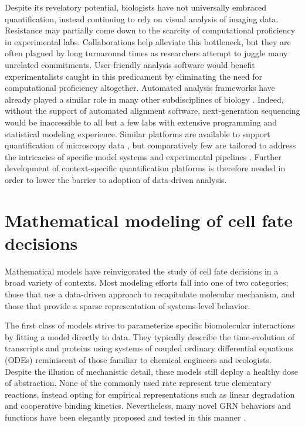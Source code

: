 Despite its revelatory potential, biologists have not universally embraced quantification, instead continuing to rely on visual analysis of imaging data. Resistance may partially come down to the scarcity of computational proficiency in experimental labs. Collaborations help alleviate this bottleneck, but they are often plagued by long turnaround times as researchers attempt to juggle many unrelated commitments. User-friendly analysis software would benefit experimentalists caught in this predicament by eliminating the need for computational proficiency altogether. Automated analysis frameworks have already played a similar role in many other subdisciplines of biology \cite{Aghaeepour2013,Chen2015,Pyne2009,Bernstein2008,Hellemans2007,Langmead2012,Trapnell2009,Costes2004,Kelley2015,Carpenter2006,Paintdakhi2016,Schindelin2012,Sommer2011}. Indeed, without the support of automated alignment software, next-generation sequencing would be inaccessible to all but a few labs with extensive programming and statistical modeling experience. Similar platforms are available to support quantification of microscopy data \cite{Schindelin2015,Sbalzarini2016}, but comparatively few are tailored to address the intricacies of specific model systems and experimental pipelines \cite{Jug2014}. Further development of context-specific quantification platforms is therefore needed in order to lower the barrier to adoption of data-driven analysis.

\section{Mathematical modeling of cell fate decisions}

Mathematical models have reinvigorated the study of cell fate decisions in a broad variety of contexts. Most modeling efforts fall into one of two categories; those that use a data-driven approach to recapitulate molecular mechanism, and those that provide a sparse representation of systems-level behavior. 

The first class of models strive to parameterize specific biomolecular interactions by fitting a model directly to data. They typically describe the time-evolution of transcripts and proteins using systems of coupled ordinary differential equations (ODEs) reminiscent of those familiar to chemical engineers and ecologists. Despite the illusion of mechanistic detail, these models still deploy a healthy dose of abstraction. None of the commonly used rate represent true elementary reactions, instead opting for empirical representations such as linear degradation and cooperative binding kinetics. Nevertheless, many novel GRN behaviors and functions have been elegantly proposed and tested in this manner \cite{Barkai1997b,Yu2008a,Paulsen2011}. 

